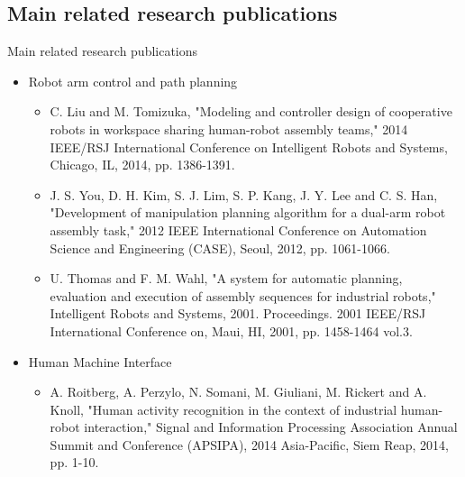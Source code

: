 \subsection{Main related research publications}
\begin{frame}{Main related research publications}
	\begin{itemize}
		\item Robot arm control and path planning
		\begin{itemize}
			\begingroup
			\scriptsize
			\item C. Liu and M. Tomizuka, "Modeling and controller design of cooperative robots in workspace sharing human-robot assembly teams," 2014 IEEE/RSJ International Conference on Intelligent Robots and Systems, Chicago, IL, 2014, pp. 1386-1391.
			\item J. S. You, D. H. Kim, S. J. Lim, S. P. Kang, J. Y. Lee and C. S. Han, "Development of manipulation planning algorithm for a dual-arm robot assembly task," 2012 IEEE International Conference on Automation Science and Engineering (CASE), Seoul, 2012, pp. 1061-1066.
			\item U. Thomas and F. M. Wahl, "A system for automatic planning, evaluation and execution of assembly sequences for industrial robots," Intelligent Robots and Systems, 2001. Proceedings. 2001 IEEE/RSJ International Conference on, Maui, HI, 2001, pp. 1458-1464 vol.3.
			\endgroup
		\end{itemize}
		
		\item Human Machine Interface
		\begin{itemize}
			\begingroup
			\scriptsize
			\item A. Roitberg, A. Perzylo, N. Somani, M. Giuliani, M. Rickert and A. Knoll, "Human activity recognition in the context of industrial human-robot interaction," Signal and Information Processing Association Annual Summit and Conference (APSIPA), 2014 Asia-Pacific, Siem Reap, 2014, pp. 1-10.
			\endgroup
		\end{itemize}
	\end{itemize}
\end{frame}

